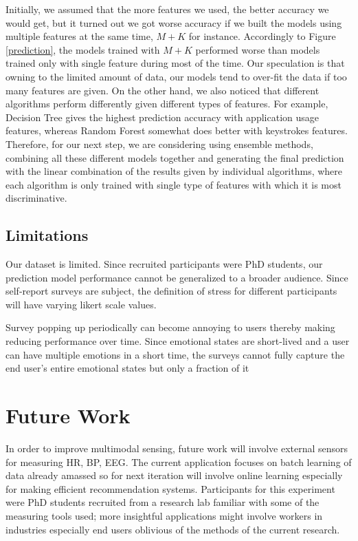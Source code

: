 \documentclass{article}
\begin{document}
Initially, we assumed that the more features we used, the better accuracy we would get, but it turned out we got worse accuracy if we built the models using multiple features at the same time, $M+K$ for instance. Accordingly to Figure \ref{prediction}, the models trained with $M+K$ performed worse than models trained only with single feature during most of the time. Our speculation is that owning to the limited amount of data, our models tend to over-fit the data if too many features are given. On the other hand, we also noticed that different algorithms perform differently given different types of features. For example, Decision Tree gives the highest prediction accuracy with application usage features, whereas Random Forest somewhat does better with keystrokes features. Therefore, for our next step, we are considering using ensemble methods, combining all these different models together and generating the final prediction with the linear combination of the results given by individual algorithms, where each algorithm is only trained with single type of features with which it is most discriminative.  
 
\subsection{Limitations}
Our dataset is limited. Since recruited participants were PhD students, our prediction model performance cannot be generalized to a broader audience. Since self-report surveys are subject, the definition of stress for different participants will have varying likert scale values. 

Survey popping up periodically can become annoying to users thereby making reducing performance over time. Since emotional states are short-lived and a user can have multiple emotions in a short time, the surveys cannot fully capture the end user's entire emotional states but only a fraction of it



\section{Future Work}
In order to improve multimodal sensing, future work will involve external sensors for measuring HR, BP, EEG. The current application focuses on batch learning of data already amassed so for next iteration will involve online learning especially for making efficient recommendation systems. Participants for this experiment were PhD students recruited from a research lab familiar with some of the measuring tools used; more insightful applications might involve workers in industries especially end users oblivious of the methods of the current research.
\end{document}
